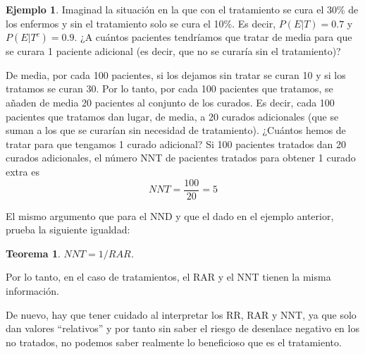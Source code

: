 \documentclass[
]{book}
\newtheorem{theorem}{Teorema}[chapter]
\theoremstyle{definition}
\theoremstyle{definition}
\newtheorem{example}{Ejemplo}[chapter]
\theoremstyle{definition}
\theoremstyle{definition}
\theoremstyle{remark}
\begin{document}
\begin{example}
\protect\hypertarget{exm:unnamed-chunk-195}{}\label{exm:unnamed-chunk-195}Imaginad la situación en la que con el tratamiento se cura el 30\% de los enfermos y sin el tratamiento solo se cura el 10\%. Es decir, \(P(E|T)=0.7\) y \(P(E|T^c)=0.9\). ¿A cuántos pacientes tendríamos que tratar de media para que se curara 1 paciente adicional (es decir, que no se curaría sin el tratamiento)?

De media, por cada 100 pacientes, si los dejamos sin tratar se curan 10 y si los tratamos se curan 30. Por lo tanto, por cada 100 pacientes que tratamos, se añaden de media 20 pacientes al conjunto de los curados. Es decir, cada 100 pacientes que tratamos dan lugar, de media, a 20 curados adicionales (que se suman a los que se curarían sin necesidad de tratamiento). ¿Cuántos hemos de tratar para que tengamos 1 curado adicional? Si 100 pacientes tratados dan 20 curados adicionales, el número NNT de pacientes tratados para obtener 1 curado extra es
\[
NNT=\frac{100}{20}=5
\]
\end{example}

El mismo argumento que para el NND y que el dado en el ejemplo anterior, prueba la siguiente igualdad:

\begin{theorem}
\protect\hypertarget{thm:unnamed-chunk-196}{}\label{thm:unnamed-chunk-196}\(NNT=1/RAR\).
\end{theorem}

Por lo tanto, en el caso de tratamientos, el RAR y el NNT tienen la misma información.

De nuevo, hay que tener cuidado al interpretar los RR, RAR y NNT, ya que solo dan valores ``relativos'' y por tanto sin saber el riesgo de desenlace negativo en los no tratados, no podemos saber realmente lo beneficioso que es el tratamiento.
\end{document}
